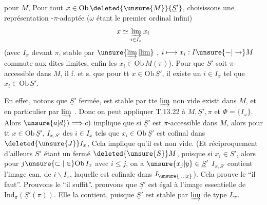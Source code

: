 
pour $M$, 
Pour  tout
$x\in\mathrm{Ob}\,\deleted{\unsure{M}}{\underline S'}$, choisissons
une représentation \deleted{$\unsure{\alpha}$}-$\pi$-adaptée
($\omega$ étant le premier ordinal infini)
\[
 x\simeq\varinjlim_{i\in I_x}x_i
\]
(avec $I_x$  devant $\pi$, stable par
$\unsure{\varinjlim|\underline{\lim}}$ 
, $i\longmapsto x_i:I\unsure{-|\to}M$
commute aux dites limites, enfin les $x_i\in\mathrm{Ob}\,M(\pi)$).
Pour que $\underline S'$ soit $\pi$-accessible dans $M$, il f. et s.
que pour tt $x\in\mathrm{Ob}\,\underline S'$, il existe un
$i\in I_x$ tel que $x_i\in\mathrm{Ob}\,\underline S'$.

En effet,  notons que $\underline S'$
 fermée, est stable  par tte
$\varinjlim$ non vide existt dans $M$, et en particulier par
$\varinjlim$  .
Donc on peut appliquer T.13.22  à
$M,\underline S',\pi$ et $\Phi=\{I_{\omega}\}$.
Alors $\unsure{a|d})\Longrightarrow c)$ implique que si
$\underline S'$ est $\pi$-accessible dans $M$, alors pour tt
$x\in\mathrm{Ob}\,\underline S'$,  $I_{x,S'}$ des $i\in I_x$
tels que $x_i\in\mathrm{Ob}\,\underline S'$ est cofinal dans
$\deleted{\unsure{J}}I_x$,  Cela implique qu'il
est non vide. (Et réciproquement d'ailleurs $\underline S'$ étant un
fermé  $\deleted{\unsure{S}}M$, puisque si $x_i\in\underline S'$,
alors pour $j\unsure{\subset|\in}\mathrm{Ob}\,I_x$ avec $i\leq j$,
on a $\unsure{x_j|y}\in\underline S'$ 
 $I_{x,S'}$ contient l'image can. de $i\backslash I_x$,
laquelle est cofinale dans $I_{\unsure{\ldotp\ldotp\ldotp|x}}$).
Cela prouve le ``il faut''.
Prouvons le ``il suffit''. 
prouvons que $\underline S'$ est égal à l'image essentielle de
$\mathrm{Ind}_{\pi}(\underline S'(\pi))$. Elle la contient,
puisque $\underline S'$ est stable par $\varinjlim$ de type $L_{\pi}$.
